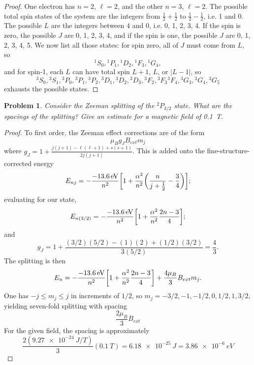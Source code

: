 \documentclass{article}
\newtheorem{plm}{Problem}
\begin{document}
\begin{proof}
  One electron has $n = 2$, $\ell = 2$, and the other $n = 3$, $\ell = 2$.
  The possible total spin states of the system are the integers from $\frac{1}{2} + \frac{1}{2}$ to $\frac{1}{2} - \frac{1}{2}$, i.e. 1 and 0.
  The possible $L$ are the integers between $4$ and $0$, i.e. 0, 1, 2, 3, 4.
  If the spin is zero, the possible $J$ are 0, 1, 2, 3, 4, and if the spin is one, the possible $J$ are 0, 1, 2, 3, 4, 5.
  We now list all those states: for spin zero, all of $J$ must come from $L$, so
  \[
    {}^{1}S_{0}, {}^{1}P_{1}, {}^{1}D_{2}, {}^{1}F_{3}, {}^{1}G_{4},
  \]
  and for spin-1, each $L$ can have total spin $L + 1$, $L$, or $|L - 1|$, so
  \[
    {}^{3}S_{0}, {}^{3}S_{1}, {}^{3}P_{0}, {}^{3}P_{1}, {}^{3}P_{2}, {}^{3}D_{1}, {}^{3}D_{2}, {}^{3}D_{3}, {}^{3}F_{2}, {}^{3}F_{3} {}^{3}F_{4},
    {}^{3}G_{3}, {}^{3}G_{4}, {}^{3}G_{5}
  \]
  exhausts the possible states.
\end{proof}

\begin{plm}
  Consider the Zeeman splitting of the $^{2}P_{3/2}$ state.
  What are the spacings of the splitting?
  Give an estimate for a magnetic field of \SI{0.1}{T}.
\end{plm}

\begin{proof}
  To first order, the Zeeman effect corrections are of the form
  \[
    \mu_{B}g_{J}B_{ext}m_{j}
  \]
  where $g_{J} = 1 + \frac{j(j+1) - \ell(\ell + 1) + s(s + 1)}{2j(j + 1)}$.
  This is added onto the fine-structure-corrected energy
  \[
    E_{nj} = -\frac{\SI{-13.6}{eV}}{n^{2}}\qty[1 + \frac{\alpha^{2}}{n^{2}}\qty(\frac{n}{j + \frac{1}{2}} - \frac{3}{4})];
  \]
  evaluating for our state,
  \[
    E_{n(3/2)} = -\frac{\SI{-13.6}{eV}}{n^{2}}\qty[1 + \frac{\alpha^{2}}{n^{2}}\frac{2n - 3}{4}];
  \]
  and
  \[
    g_{J} = 1 + \frac{(3/2)(5/2) - (1)(2) + (1/2)(3/2)}{3(5/2)} = \frac{4}{3}.
  \]
  The splitting is then
  \[
    E_{n} = -\frac{\SI{-13.6}{eV}}{n^{2}}\qty[1 + \frac{\alpha^{2}}{n^{2}}\frac{2n - 3}{4}] + \frac{4\mu_{B}}{3}B_{ext}m_{j}.
  \]
  One has $-j \leq m_{j} \leq j$ in increments of $1/2$, so $m_{j} = -3/2, -1, -1/2, 0, 1/2, 1, 3/2$, yielding seven-fold splitting with spacing
  \[
    \frac{2\mu_{B}}{3}B_{ext}
  \]
  For the given field, the spacing is approximately
  \[
    \frac{2(\SI{9.27e-24}{J/T})}{3}(\SI{0.1}{T}) = \SI{6.18e-25}{J} = \SI{3.86e-6}{eV}
  \]
\end{proof}
\end{document}
